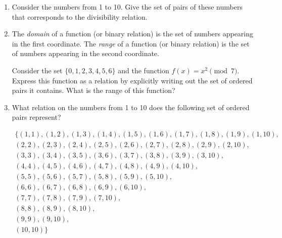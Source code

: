 \begin{enumerate}

\item Consider the numbers from 1 to 10.  Give the set of pairs of these numbers that 
corresponds to the divisibility relation.

\vfill


\vfill

\item The \emph{domain} of a function (or binary relation) 
is the set of numbers appearing in the first coordinate.  The  
\emph{range} of a function (or binary relation) is the set of numbers 
appearing in the second coordinate.  

Consider the set $\{0,1,2,3,4,5,6\}$ and the function $f(x) = x^2 \pmod{7}$.
Express this function as a relation by explicitly writing out the set of
ordered pairs it contains.  What is the range of this function?
 
 \vfill
 
\hint{
\[ f \; = \; \{(0,0), (1,1), (2,4), (3,2), (4,2), (5,4), (6,1)\} \]
\[ \Rng{f} \;= \; \{0,1,2,4\} \]

}

\vfill

\workbookpagebreak
\hintspagebreak

\item What relation on the numbers from 1 to 10 does the following set of ordered pairs
represent?

\begin{gather*}
\{ (1,1), (1,2), (1,3), (1,4), (1,5), (1,6), (1,7), (1,8), (1,9), (1,10), \\
(2,2), (2,3), (2,4), (2,5), (2,6), (2,7), (2,8), (2,9), (2,10), \\
(3,3), (3,4), (3,5), (3,6), (3,7), (3,8), (3,9), (3,10), \\
(4,4), (4,5), (4,6), (4,7), (4,8), (4,9), (4,10), \\
(5,5), (5,6), (5,7), (5,8), (5,9), (5,10), \\
(6,6), (6,7), (6,8), (6,9), (6,10), \\
(7,7), (7,8), (7,9), (7,10), \\
(8,8), (8,9), (8,10), \\
(9,9), (9,10), \\
(10,10) \} 
\end{gather*}


\end{enumerate}
